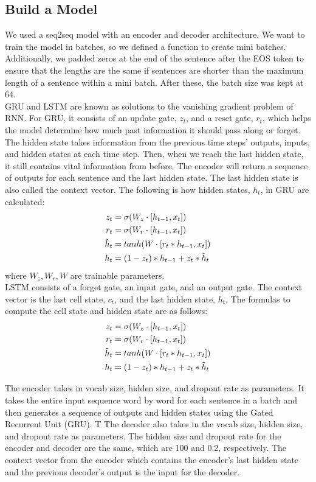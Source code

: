 \documentclass[conference]{IEEEtran}
\begin{document}
\subsection{Build a Model}
\indent We used a seq2seq model with an encoder and decoder architecture. We want to train the model in batches, so we defined a function to create mini batches. Additionally, we padded zeros at the end of the sentence after the EOS token to ensure that the lengths are the same if sentences are shorter than the maximum length of a sentence within a mini batch. After these, the batch size was kept at 64. \\
\indent GRU and LSTM are known as solutions to the vanishing gradient problem of RNN. For GRU, it consists of an update gate, $z_t$, and a reset gate, $r_t$, which helps the model determine how much past information it should pass along or forget. The hidden state takes information from the previous time steps’ outputs, inputs, and hidden states at each time step. Then, when we reach the last hidden state, it still contains vital information from before. The encoder will return a sequence of outputs for each sentence and the last hidden state. The last hidden state is also called the context vector. The following is how hidden states, $h_t$, in GRU are calculated: 
\begin{align}
z_t &= \sigma(W_z \cdot [h_{t-1},x_t]) \\
r_t &= \sigma(W_r \cdot [h_{t-1},x_t]) \\
\Tilde{h}_t &= tanh(W\cdot [r_t*h_{t-1},x_t]) \\
h_t &=(1-z_t)*h_{t-1}+z_t*\Tilde{h}_t 
\end{align}
where $W_z, W_r, W$ are trainable parameters. \\
LSTM consists of a forget gate, an input gate, and an output gate. The context vector is the last cell state, $c_t$, and the last hidden state, $h_t$. The formulas to compute the cell state and hidden state are as follows:
\begin{align}
z_t &= \sigma(W_z \cdot [h_{t-1},x_t]) \\
r_t &= \sigma(W_r \cdot [h_{t-1},x_t]) \\
\Tilde{h}_t &= tanh(W\cdot [r_t*h_{t-1},x_t]) \\
h_t &=(1-z_t)*h_{t-1}+z_t*\Tilde{h}_t 
\end{align}

The encoder takes in vocab size, hidden size, and dropout rate as parameters. It takes the entire input sequence word by word for each sentence in a batch and then generates a sequence of outputs and hidden states using the Gated Recurrent Unit (GRU). T
\indent The decoder also takes in the vocab size, hidden size, and dropout rate as parameters. The hidden size and dropout rate for the encoder and decoder are the same, which are 100 and 0.2, respectively. The context vector from the encoder which contains the encoder’s last hidden state and the previous decoder’s output is the input for the decoder. 
\end{document}
